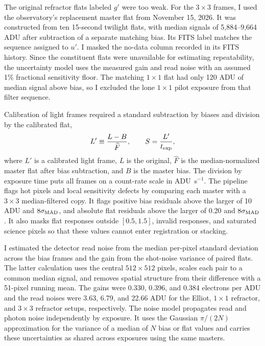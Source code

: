 The original refractor flats labeled $g'$ were too weak. For the $3\times3$ frames, I used the observatory's replacement master flat from November 15, 2026. It was constructed from ten 15-second twilight flats, with median signals of 5,884--9,664 ADU after subtraction of a separate matching bias. Its FITS label matches the sequence assigned to $u'$. I masked the no-data column recorded in its FITS history. Since the constituent flats were unavailable for estimating repeatability, the uncertainty model uses the measured gain and read noise with an assumed 1\% fractional sensitivity floor. The matching $1\times1$ flat had only 120 ADU of median signal above bias, so I excluded the lone $1\times1$ pilot exposure from that filter sequence.

Calibration of light frames required a standard subtraction by biases and division by the calibrated flat,
\begin{equation}
    L' \equiv \frac{L-B}{\widehat F},
    \qquad
    S=\frac{L'}{t_{\rm exp}},
    \label{eq:detector-cal}
\end{equation}
where $L'$ is a calibrated light frame, $L$ is the original, $\widehat F$ is the median-normalized master flat after bias subtraction, and $B$ is the master bias. The division by exposure time puts all frames on a count-rate scale in ADU~s$^{-1}$. The pipeline flags hot pixels and local sensitivity defects by comparing each master with a $3\times3$ median-filtered copy. It flags positive bias residuals above the larger of 10 ADU and $8\sigma_{\rm MAD}$, and absolute flat residuals above the larger of 0.20 and $8\sigma_{\rm MAD}$. It also masks flat responses outside $[0.5,1.5]$, invalid responses, and saturated science pixels so that these values cannot enter registration or stacking.

I estimated the detector read noise from the median per-pixel standard deviation across the bias frames and the gain from the shot-noise variance of paired flats. The latter calculation uses the central $512\times512$ pixels, scales each pair to a common median signal, and removes spatial structure from their difference with a 51-pixel running mean. The gains were 0.330, 0.396, and 0.384 electrons per ADU and the read noises were 3.63, 6.79, and 22.66 ADU for the Elliot, $1\times1$ refractor, and $3\times3$ refractor setups, respectively. The noise model propagates read and photon noise independently by exposure. It uses the Gaussian $\pi/(2N)$ approximation for the variance of a median of $N$ bias or flat values and carries these uncertainties as shared across exposures using the same masters.

